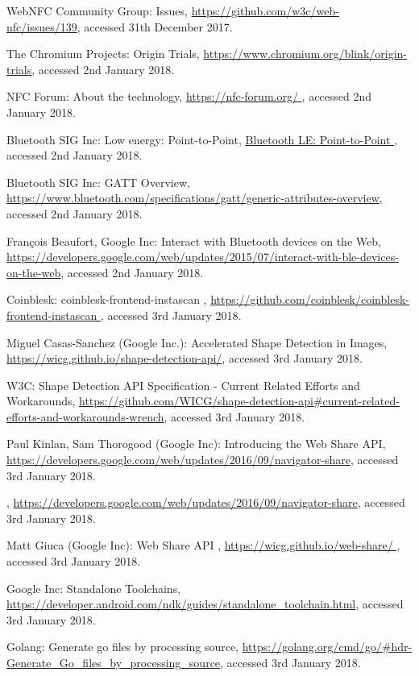 \begin{thebibliography}{99}
WebNFC Community Group: Issues, \url{https://github.com/w3c/web-nfc/issues/139}, accessed 31th December 2017.

The Chromium Projects: Origin Trials, \url{https://www.chromium.org/blink/origin-trials}, accessed 2nd January 2018.

NFC Forum: About the technology, \url{https://nfc-forum.org/
}, accessed 2nd January 2018.

Bluetooth SIG Inc: Low energy: Point-to-Point, \url{Bluetooth LE: Point-to-Point
}, accessed 2nd January 2018.

Bluetooth SIG Inc: GATT Overview, \url{https://www.bluetooth.com/specifications/gatt/generic-attributes-overview}, accessed 2nd January 2018.

François Beaufort, Google Inc: Interact with Bluetooth devices on the Web, \url{https://developers.google.com/web/updates/2015/07/interact-with-ble-devices-on-the-web}, accessed 2nd January 2018.

Coinblesk: coinblesk-frontend-instascan
, \url{https://github.com/coinblesk/coinblesk-frontend-instascan
}, accessed 3rd January 2018.

Miguel Casas-Sanchez (Google Inc.): Accelerated Shape Detection in Images, \url{https://wicg.github.io/shape-detection-api/}, accessed 3rd January 2018.

W3C: Shape Detection API Specification 
- Current Related Efforts and Workarounds, \url{https://github.com/WICG/shape-detection-api#current-related-efforts-and-workarounds-wrench}, accessed 3rd January 2018.

 Paul Kinlan, Sam Thorogood (Google Inc): Introducing the Web Share API, \url{https://developers.google.com/web/updates/2016/09/navigator-share}, accessed 3rd January 2018.

, \url{https://developers.google.com/web/updates/2016/09/navigator-share}, accessed 3rd January 2018.

 Matt Giuca (Google Inc): Web Share API
, \url{https://wicg.github.io/web-share/
}, accessed 3rd January 2018.

 Google Inc: Standalone Toolchains, \url{https://developer.android.com/ndk/guides/standalone_toolchain.html}, accessed 3rd January 2018.

 Golang: Generate go files by processing source, \url{https://golang.org/cmd/go/#hdr-Generate_Go_files_by_processing_source}, accessed 3rd January 2018.


\end{thebibliography}
